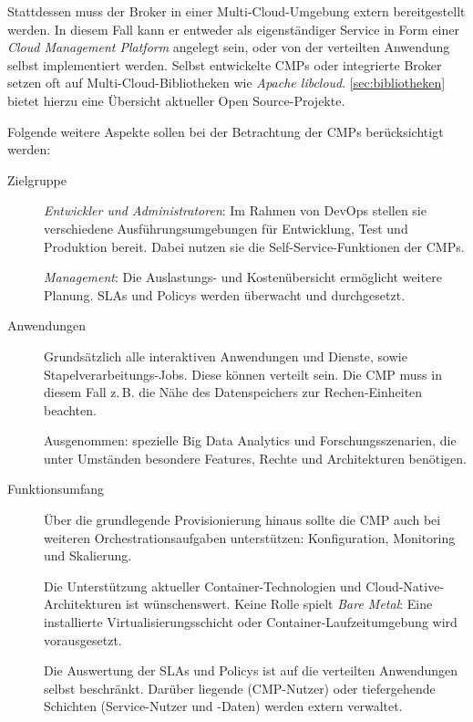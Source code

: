 Stattdessen muss der Broker in einer Multi-Cloud-Umgebung extern bereitgestellt werden. In diesem Fall kann er entweder als eigenständiger Service in Form einer \emph{Cloud Management Platform} angelegt sein, oder von der verteilten Anwendung selbst implementiert werden. Selbst entwickelte CMPs oder integrierte Broker setzen oft auf Multi-Cloud-Bibliotheken wie \emph{Apache libcloud}. \autoref{sec:bibliotheken} bietet hierzu eine Übersicht aktueller Open Source-Projekte. 

Folgende weitere Aspekte sollen bei der Betrachtung der CMPs berücksichtigt werden:

\begin{description}
	
	\item[Zielgruppe] 	\emph{Entwickler und Administratoren}: Im Rahmen von DevOps stellen sie verschiedene Ausführungsumgebungen für Entwicklung, Test und Produktion bereit. Dabei nutzen sie die Self-Service-Funktionen der CMPs.
	
						\emph{Management}: Die Auslastungs- und Kostenübersicht ermöglicht weitere Planung. SLAs und Policys werden überwacht und durchgesetzt.
	
	\item[Anwendungen] Grundsätzlich alle interaktiven Anwendungen und Dienste, sowie Stapelverarbeitungs-Jobs. Diese können verteilt sein. Die CMP muss in diesem Fall z.\,B. die Nähe des Datenspeichers zur Rechen-Einheiten beachten.
	
	Ausgenommen: spezielle Big Data Analytics und Forschungsszenarien, die unter Umständen besondere Features, Rechte und Architekturen benötigen.
	
	\item[Funktionsumfang] Über die grundlegende Provisionierung hinaus sollte die CMP auch bei weiteren Orchestrationsaufgaben unterstützen: Konfiguration, Monitoring und Skalierung.
	
	Die Unterstützung aktueller Container-Technologien und Cloud-Native-Architekturen ist wünschenswert. Keine Rolle spielt \emph{Bare Metal}: Eine installierte Virtualisierungsschicht oder Container-Laufzeitumgebung wird vorausgesetzt. 
	
	Die Auswertung der SLAs und Policys ist auf die verteilten Anwendungen selbst beschränkt. Darüber liegende (CMP-Nutzer) oder tiefergehende Schichten (Service-Nutzer und -Daten) werden extern verwaltet.
		
\end{description}


